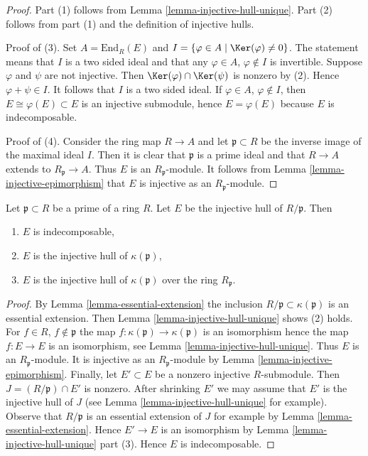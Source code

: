 \begin{proof}
Part (1) follows from Lemma \ref{lemma-injective-hull-unique}.
Part (2) follows from part (1) and the definition of injective hulls.

\medskip\noindent
Proof of (3). Set $A = \text{End}_R(E)$ and
$I = \{\varphi \in A \mid \Ker(\varphi) \not = 0\}$.
The statement means that $I$ is a two sided ideal and
that any $\varphi \in A$, $\varphi \not \in I$ is invertible.
Suppose $\varphi$ and $\psi$ are not injective.
Then $\Ker(\varphi) \cap \Ker(\psi)$ is nonzero
by (2). Hence $\varphi + \psi \in I$. It follows that $I$
is a two sided ideal. If $\varphi \in A$, $\varphi \not \in I$,
then $E \cong \varphi(E) \subset E$ is an injective submodule,
hence $E = \varphi(E)$ because $E$ is indecomposable.

\medskip\noindent
Proof of (4). Consider the ring map $R \to A$ and let $\mathfrak p \subset R$
be the inverse image of the maximal ideal $I$. Then it is clear
that $\mathfrak p$ is a prime ideal and that $R \to A$ extends to
$R_\mathfrak p \to A$. Thus $E$ is an $R_\mathfrak p$-module.
It follows from Lemma \ref{lemma-injective-epimorphism} that $E$ is injective
as an $R_\mathfrak p$-module.
\end{proof}

\begin{lemma}
\label{lemma-injective-hull-indecomposable}
Let $\mathfrak p \subset R$ be a prime of a ring $R$.
Let $E$ be the injective hull of $R/\mathfrak p$. Then
\begin{enumerate}
\item $E$ is indecomposable,
\item $E$ is the injective hull of $\kappa(\mathfrak p)$,
\item $E$ is the injective hull of $\kappa(\mathfrak p)$
over the ring $R_\mathfrak p$.
\end{enumerate}
\end{lemma}

\begin{proof}
By Lemma \ref{lemma-essential-extension} the inclusion
$R/\mathfrak p \subset \kappa(\mathfrak p)$ is an essential
extension. Then Lemma \ref{lemma-injective-hull-unique}
shows (2) holds. For $f \in R$, $f \not \in \mathfrak p$
the map $f : \kappa(\mathfrak p) \to \kappa(\mathfrak p)$ is an isomorphism
hence the map $f : E \to E$ is an isomorphism,
see Lemma \ref{lemma-injective-hull-unique}.
Thus $E$ is an $R_\mathfrak p$-module. It is injective
as an $R_\mathfrak p$-module by Lemma \ref{lemma-injective-epimorphism}.
Finally, let $E' \subset E$ be a nonzero injective $R$-submodule.
Then $J = (R/\mathfrak p) \cap E'$ is nonzero. After shrinking $E'$
we may assume that $E'$ is the injective hull of $J$ (see
Lemma \ref{lemma-injective-hull-unique} for example).
Observe that $R/\mathfrak p$ is an essential extension of $J$ for example by
Lemma \ref{lemma-essential-extension}. Hence $E' \to E$
is an isomorphism by Lemma \ref{lemma-injective-hull-unique} part (3).
Hence $E$ is indecomposable.
\end{proof}

